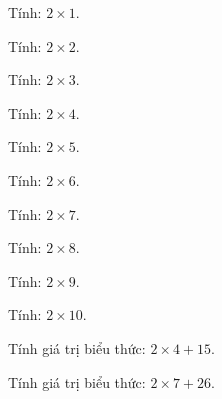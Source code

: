 \begin{ex}
Tính: $2 \times 1$.
\end{ex}

\begin{ex}
Tính: $2 \times 2$.
\end{ex}

\begin{ex}
Tính: $2 \times 3$.
\end{ex}

\begin{ex}
Tính: $2 \times 4$.
\end{ex}

\begin{ex}
Tính: $2 \times 5$.
\end{ex}

\begin{ex}
Tính: $2 \times 6$.
\end{ex}

\begin{ex}
Tính: $2 \times 7$.
\end{ex}

\begin{ex}
Tính: $2 \times 8$.
\end{ex}

\begin{ex}
Tính: $2 \times 9$.
\end{ex}

\begin{ex}
Tính: $2 \times 10$.
\end{ex}

\begin{ex}
Tính giá trị biểu thức: $2 \times 4 + 15$.
\end{ex}

\begin{ex}
Tính giá trị biểu thức: $2 \times 7 + 26$.
\end{ex}

